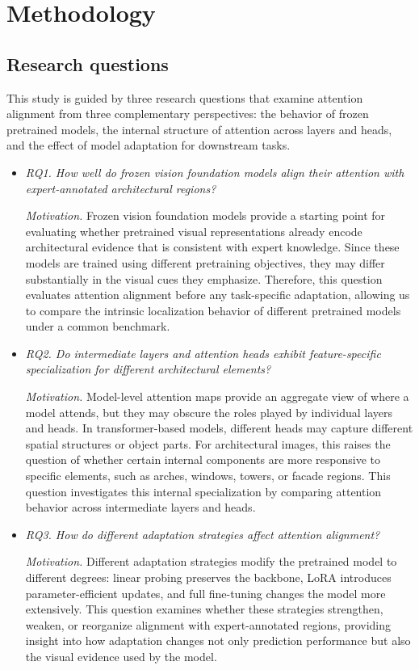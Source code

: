 \documentclass[lineno,pdflatex,sn-mathphys-num]{sn-jnl}%
\theoremstyle{thmstyleone}%
\theoremstyle{thmstyletwo}%
\theoremstyle{thmstylethree}%
\begin{document}
\section{Methodology} \label{section proposed approach}

\subsection{Research questions}

This study is guided by three research questions that examine attention alignment from three complementary perspectives: the behavior of frozen pretrained models, the internal structure of attention across layers and heads, and the effect of model adaptation for downstream tasks.

\begin{itemize}
\item \textit{RQ1. How well do frozen vision foundation models align their attention with expert-annotated architectural regions?}

\textit{Motivation.} Frozen vision foundation models provide a starting point for evaluating whether pretrained visual representations already encode architectural evidence that is consistent with expert knowledge. Since these models are trained using different pretraining objectives, they may differ substantially in the visual cues they emphasize. Therefore, this question evaluates attention alignment before any task-specific adaptation, allowing us to compare the intrinsic localization behavior of different pretrained models under a common benchmark.

\item \textit{RQ2. Do intermediate layers and attention heads exhibit feature-specific specialization for different architectural elements?}

\textit{Motivation.} Model-level attention maps provide an aggregate view of where a model attends, but they may obscure the roles played by individual layers and heads. In transformer-based models, different heads may capture different spatial structures or object parts. For architectural images, this raises the question of whether certain internal components are more responsive to specific elements, such as arches, windows, towers, or facade regions. This question investigates this internal specialization by comparing attention behavior across intermediate layers and heads.
\item \textit{RQ3. How do different adaptation strategies affect attention alignment?}

\textit{Motivation.} Different adaptation strategies modify the pretrained model to different degrees: linear probing preserves the backbone, LoRA introduces parameter-efficient updates, and full fine-tuning changes the model more extensively. This question examines whether these strategies strengthen, weaken, or reorganize alignment with expert-annotated regions, providing insight into how adaptation changes not only prediction performance but also the visual evidence used by the model.
\end{itemize}
\end{document}
